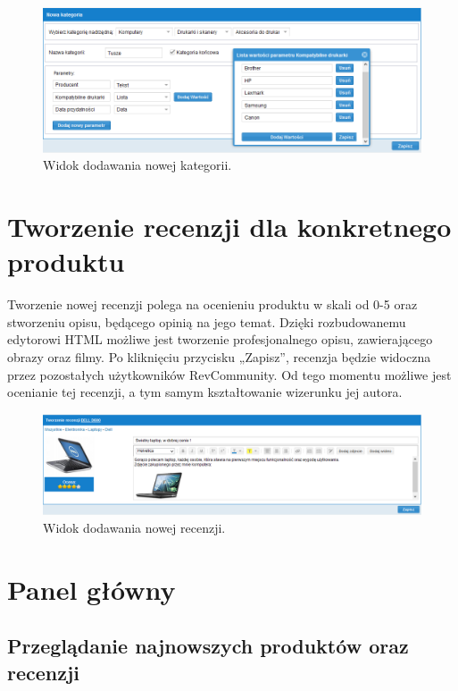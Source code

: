 \begin{figure}[h]
	\centering
	\includegraphics[width=1.00\textwidth]{images/nowa_kategoria.PNG}
	\caption{Widok dodawania nowej kategorii.}
\end{figure}
\newpage

\section{Tworzenie recenzji dla konkretnego produktu}

Tworzenie nowej recenzji polega na ocenieniu produktu w skali od 0-5 oraz stworzeniu opisu, będącego opinią na jego temat. Dzięki rozbudowanemu edytorowi HTML możliwe jest tworzenie profesjonalnego opisu, zawierającego obrazy oraz filmy. Po kliknięciu przycisku „Zapisz”, recenzja będzie widoczna przez pozostałych użytkowników RevCommunity. Od tego momentu możliwe jest ocenianie tej recenzji, a tym samym kształtowanie wizerunku jej autora.

\begin{figure}[h]
	\centering
	\includegraphics[width=1.00\textwidth]{images/nowa_recenzja.PNG}
	\caption{Widok dodawania nowej recenzji.}
\end{figure}

\section{Panel główny}

\subsection{Przeglądanie najnowszych produktów oraz recenzji}


